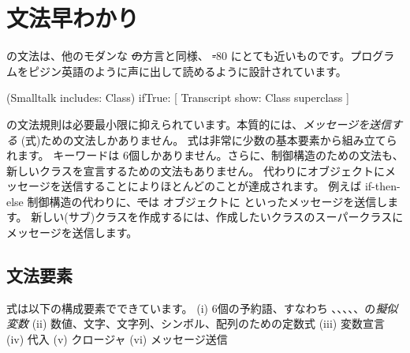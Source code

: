 \documentclass[a4paper,10pt,twoside]{book}
\begin{document}
	\renewcommand{\nnbb}[2]{} %
	\sloppy
\fi
\chapter{文法早わかり}



\pharo の文法は、他のモダンな \st の方言と同様、 \st-80 にとても近いものです。プログラムをピジン英語のように声に出して読めるように設計されています。

\begin{code}{}
(Smalltalk includes: Class) ifTrue: [ Transcript show: Class superclass ]
\end{code}

\noindent
\pharo の文法規則は必要最小限に抑えられています。本質的には、\emph{メッセージを送信する} (\ie 式)ための文法しかありません。
式は非常に少数の基本要素から組み立てられます。
キーワードは 6個しかありません。さらに、制御構造のための文法も、新しいクラスを宣言するための文法もありません。
代わりにオブジェクトにメッセージを送信することによりほとんどのことが達成されます。
例えば if-then-else 制御構造の代わりに、\st では  オブジェクトに  といったメッセージを送信します。
新しい\mbox{(サブ)クラス}を作成するには、作成したいクラスのスーパークラスにメッセージを送信します。

\section{文法要素}

式は以下の構成要素でできています。
(i) 6個の予約語、すなわち 、、、、、の\emph{擬似変数}
(ii) 数値、文字、文字列、シンボル、配列のための定数式
(iii) 変数宣言
(iv) 代入
(v) クロージャ
(vi) メッセージ送信
\end{document}
